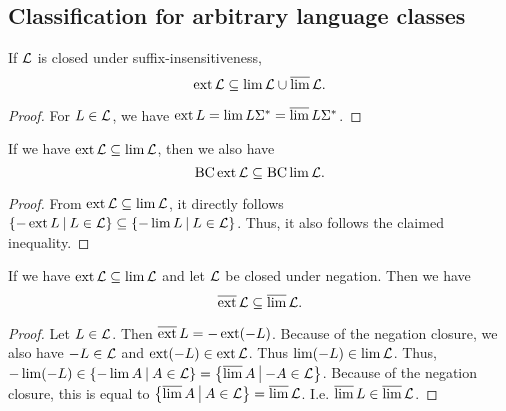 \subsection{Classification for arbitrary language classes}
\label{gen:general}

\begin{lemma}
\label{gen:non-suffix-sens}
If $\mathcal{L}$ is closed under suffix-insensitiveness,
\[ \operatorname{ext} \mathcal{L} \subseteq \lim \mathcal{L} \cup \operatorname{\overline{lim}} \mathcal{L} . \]
\begin{proof}
For $L \in \mathcal{L}$, we have $\operatorname{ext} L = \lim L \Sigma^* = \operatorname{\overline{lim}} L \Sigma^*$.
\end{proof}
\end{lemma}

\begin{lemma}
\label{gen:S302a} If we have $\operatorname{ext} \mathcal{L} \subseteq \lim \mathcal{L}$, then we also have
\[ \operatorname{BC} \operatorname{ext} \mathcal{L} \subseteq \operatorname{BC} \lim \mathcal{L} . \]
\begin{proof}
From $\operatorname{ext} \mathcal{L} \subseteq \lim \mathcal{L}$, it directly follows $\Set{-\ext L}{L \in \Lang} \subseteq \Set{-\lim L}{L \in \Lang}$. Thus, it also follows the claimed inequality.
\end{proof}
\end{lemma}

\begin{lemma}
If we have $\operatorname{ext} \mathcal{L} \subseteq \lim \mathcal{L}$ and let $\mathcal{L}$ be closed under negation. Then we have
\[ \operatorname{\overline{ext}} \mathcal{L} \subseteq \operatorname{\overline{lim}} \mathcal{L} . \]
\begin{proof}
Let $L \in \mathcal{L}$. Then $ \operatorname{\overline{ext}} L = - \operatorname{ext} (-L) $. Because of the negation closure, we also have $-L \in \mathcal{L}$ and $\operatorname{ext}(-L) \in \operatorname{ext} \mathcal{L}$. Thus $\lim(-L) \in \lim \mathcal{L}$. Thus, $-\lim(-L) \in \Set{-\lim A}{A \in \Lang} = \Set{\dlim A}{-A \in \Lang}$. Because of the negation closure, this is equal to $\Set{\dlim A}{A \in \Lang} = \dlim \Lang$. I.e. $\operatorname{\overline{lim}} L \in \operatorname{\overline{lim}} \mathcal{L}$.
\end{proof}
\end{lemma}

